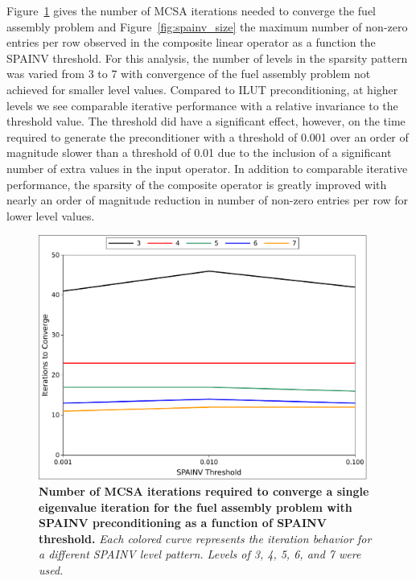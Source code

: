 Figure~\ref{fig:spainv_iterations} gives the number of MCSA iterations
needed to converge the fuel assembly problem and
Figure~\ref{fig:spainv_size} the maximum number of non-zero entries
per row observed in the composite linear operator as a function the
SPAINV threshold. For this analysis, the number of levels in the
sparsity pattern was varied from 3 to 7 with convergence of the fuel
assembly problem not achieved for smaller level values. Compared to
ILUT preconditioning, at higher levels we see comparable iterative
performance with a relative invariance to the threshold value. The
threshold did have a significant effect, however, on the time required
to generate the preconditioner with a threshold of 0.001 over an order
of magnitude slower than a threshold of 0.01 due to the inclusion of a
significant number of extra values in the input operator. In addition
to comparable iterative performance, the sparsity of the composite
operator is greatly improved with nearly an order of magnitude
reduction in number of non-zero entries per row for lower level
values.
\begin{figure}[t!]
  \begin{center}
    \includegraphics[width=4.25in]{chapters/spn_equations/spainv_iterations.pdf}
  \end{center}
  \caption{\textbf{Number of MCSA iterations required to converge a
      single eigenvalue iteration for the fuel assembly problem with
      SPAINV preconditioning as a function of SPAINV threshold.}
    \textit{Each colored curve represents the iteration behavior for a
      different SPAINV level pattern. Levels of 3, 4, 5, 6, and 7 were
      used.}}
  \label{fig:spainv_iterations}
\end{figure}
